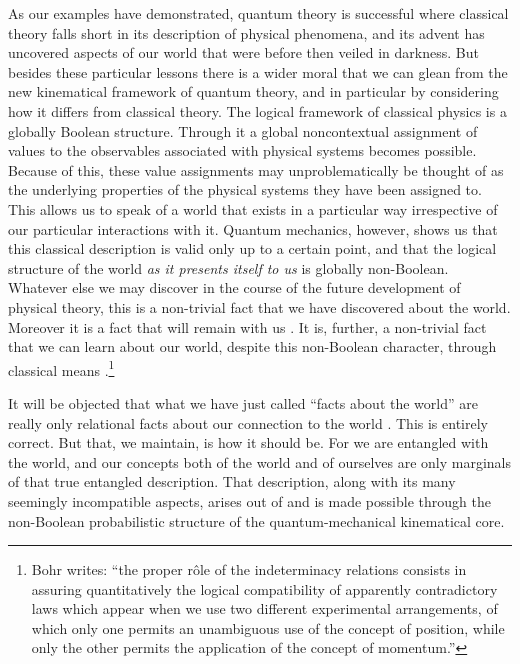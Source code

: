 As our examples have demonstrated, quantum theory is successful where classical theory falls short in its description of physical phenomena, and its advent has uncovered aspects of our world that were before then veiled in darkness. But besides these particular lessons there is a wider moral that we can glean from the new kinematical framework of quantum theory, and in particular by considering how it differs from classical theory. The logical framework of classical physics is a globally Boolean structure. Through it a global noncontextual assignment of values to the observables associated with physical systems becomes possible. Because of this, these value assignments may unproblematically be thought of as the underlying properties of the physical systems they have been assigned to. This allows us to speak of a world that exists in a particular way irrespective of our particular interactions with it. Quantum mechanics, however, shows us that this classical description is valid only up to a certain point, and that the logical structure of the world \emph{as it presents itself to us} is globally non-Boolean. Whatever else we may discover in the course of the future development of physical theory, this is a non-trivial fact that we have discovered about the world. Moreover it is a fact that will remain with us \citep[cf.][p. 98]{Pitowsky 1994}. It is, further, a non-trivial fact that we can learn about our world, despite this non-Boolean character, through classical means \citep[cf.][p. 293]{Bohr 1937}.\footnote{Bohr writes: ``the proper r\^ole of the indeterminacy relations consists in assuring quantitatively the logical compatibility of apparently contradictory laws which appear when we use two different experimental arrangements, of which only one permits an unambiguous use of the concept of position, while only the other permits the application of the concept of momentum.''}

It will be objected that what we have just called ``facts about the world'' are really only relational facts about our connection to the world \citep[cf.][]{Healey 2016}. This is entirely correct. But that, we maintain, is how it should be. For we are entangled with the world, and our concepts both of the world and of ourselves are only marginals of that true entangled description. That description, along with its many seemingly incompatible aspects, arises out of and is made possible through the non-Boolean probabilistic structure of the quantum-mechanical kinematical core.

